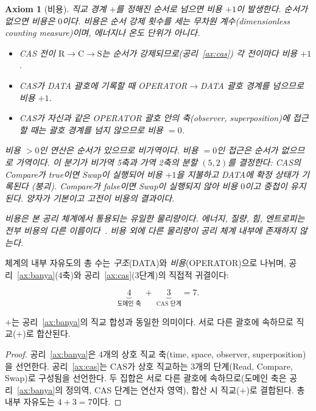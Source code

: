 \documentclass[entropy,article,submit,pdftex,oneauthor]{Definitions/mdpi}
\newtheorem{Axiom}{Axiom}
\begin{document}
\begin{Axiom}[비용]\label{ax:cost}
직교 경계 $+$를 정해진 순서로 넘으면 비용 $+1$이 발생한다. 순서가 없으면 비용은 $0$이다. 비용은 순서 강제 횟수를 세는 무차원 계수(dimensionless counting measure)이며, 에너지나 온도 단위가 아니다.
\begin{itemize}
\item CAS 전이 $\mathrm{R} \to \mathrm{C} \to \mathrm{S}$는 순서가 강제되므로(공리~\ref{ax:cas}) 각 전이마다 비용 $+1$.
\item CAS가 DATA 괄호에 기록할 때 OPERATOR$\to$DATA 괄호 경계를 넘으므로 비용 $+1$.
\item CAS가 자신과 같은 OPERATOR 괄호 안의 축(observer, superposition)에 접근할 때는 괄호 경계를 넘지 않으므로 비용 $= 0$.
\end{itemize}
비용 $> 0$인 연산은 순서가 있으므로 비가역이다. 비용 $= 0$인 접근은 순서가 없으므로 가역이다. 이 분기가 비가역 5축과 가역 2축의 분할 $(5,2)$를 결정한다: CAS의 Compare가 true이면 Swap이 실행되어 비용 $+1$을 지불하고 DATA에 확정 상태가 기록된다 (붕괴). Compare가 false이면 Swap이 실행되지 않아 비용 $0$이고 중첩이 유지된다. \emph{양자가 기본이고 고전이 비용의 결과이다.}

\textit{비용은 본 공리 체계에서 통용되는 유일한 물리량이다.} 에너지, 질량, 힘, 엔트로피는 전부 비용의 다른 이름이다~\cite{han2026}. 비용 외에 다른 물리량이 공리 체계 내부에 존재하지 않는다.
\end{Axiom}

\begin{Lemma}[완전기술자유도]\label{ax:dof}
체계의 내부 자유도의 총 수는 \emph{구조}(DATA)와 \emph{비용}(OPERATOR)으로 나뉘며, 공리~\ref{ax:banya}(4축)와 공리~\ref{ax:cas}(3단계)의 직접적 귀결이다:
\begin{linenomath}
\begin{equation}
\underbrace{4}_{\text{도메인 축}} \;+\; \underbrace{3}_{\text{CAS 단계}} = 7.
\label{eq:dof7}
\end{equation}
\end{linenomath}
$+$는 공리~\ref{ax:banya}의 직교 합성과 동일한 의미이다. 서로 다른 괄호에 속하므로 직교($+$)로 합산된다.
\end{Lemma}

\begin{proof}
공리~\ref{ax:banya}은 4개의 상호 직교 축(time, space, observer, superposition)을 선언한다. 공리~\ref{ax:cas}는 CAS가 상호 직교하는 3개의 단계(Read, Compare, Swap)로 구성됨을 선언한다. 두 집합은 서로 다른 괄호에 속하므로(도메인 축은 공리~\ref{ax:banya}의 정의역, CAS 단계는 연산자 영역), 합산 시 직교($+$)로 결합된다. 총 내부 자유도는 $4 + 3 = 7$이다.
\end{proof}
\end{document}
